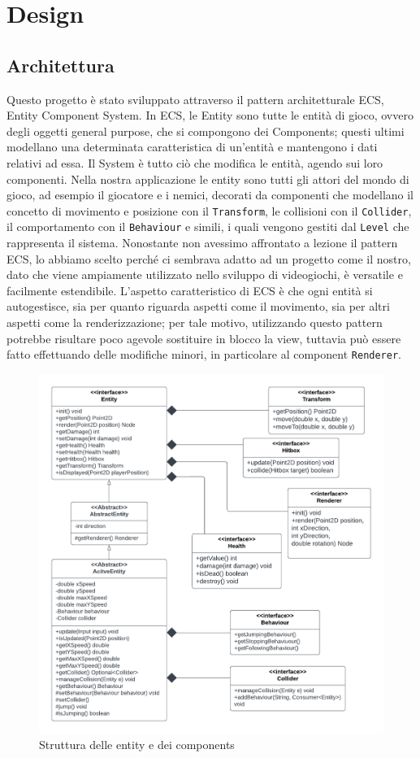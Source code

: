 \documentclass[a4paper,12pt]{report}
\begin{document}
\chapter{Design}
\section{Architettura}
Questo progetto è stato sviluppato attraverso il pattern architetturale ECS, Entity Component System.
In ECS, le Entity sono tutte le entità di gioco, ovvero degli oggetti general purpose, che si compongono dei Components; questi ultimi modellano una determinata caratteristica di un'entità e mantengono i dati relativi ad essa. Il System è tutto ciò che modifica le entità, agendo sui loro componenti. Nella nostra applicazione le entity sono tutti gli attori del mondo di gioco, ad esempio il giocatore e i nemici, decorati da componenti che modellano il concetto di movimento e posizione con il \texttt{Transform}, le collisioni con il \texttt{Collider}, il comportamento con il \texttt{Behaviour} e simili, i quali vengono gestiti dal \texttt{Level} che rappresenta il sistema.
Nonostante non avessimo affrontato a lezione il pattern ECS, lo abbiamo scelto perché ci sembrava adatto ad un progetto come il nostro, dato che viene ampiamente utilizzato nello sviluppo di videogiochi, è versatile e facilmente estendibile.
L'aspetto caratteristico di ECS è che ogni entità si autogestisce, sia per quanto riguarda aspetti come il movimento, sia per altri aspetti come la renderizzazione; per tale motivo, utilizzando questo pattern potrebbe risultare poco agevole sostituire in blocco la view, tuttavia può essere fatto effettuando delle modifiche minori, in particolare al component \texttt{Renderer}.

\begin{figure}[ht]
\includegraphics[width=1\textwidth]{umlEntityComponents.png}
\caption{Struttura delle entity e dei components}
\label{fig:schgen}
\end{figure}
\end{document}
